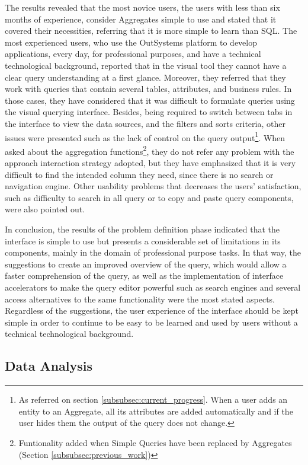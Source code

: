 The results revealed that the most novice users, the users with less than six months of experience, consider Aggregates simple to use and stated that it covered their necessities, referring that it is more simple to learn than \gls{SQL}. The most experienced users, who use the OutSystems platform to develop applications, every day, for professional purposes, and have a technical technological background, reported that in the visual tool they cannot have a clear query understanding at a first glance. Moreover, they referred that they work with queries that contain several tables, attributes, and business rules. In those cases, they have considered that it was difficult to formulate queries using the visual querying interface. Besides, being required to switch between tabs in the interface to view the data sources, and the filters and sorts criteria, other issues were presented such as the lack of control on the query output\footnote{As referred on section \ref{subsubsec:current_progress}. When a user adds an entity to an Aggregate, all its attributes are added automatically and if the user hides them the output of the query does not change.}. When asked about the aggregation functions\footnote{Funtionality added when Simple Queries have been replaced by Aggregates (Section \ref{subsubsec:previous_work})}, they do not refer any problem with the approach interaction strategy adopted, but they have emphasized that it is very difficult to find the intended column they need, since there is no search or navigation engine. Other usability problems that decreases the users’ satisfaction, such as difficulty to search in all query or to copy and paste query components, were also pointed out.

In conclusion, the results of the problem definition phase indicated that the interface is simple to use but presents a considerable set of limitations in its components, mainly in the domain of professional purpose tasks. In that way, the suggestions to create an improved overview of the query, which would allow a faster comprehension of the query, as well as the implementation of interface accelerators to make the query editor powerful such as search engines and several access alternatives to the same functionality were the most stated aspects. Regardless of the suggestions, the user experience of the interface should be kept simple in order to continue to be easy to be learned and used by users without a technical technological background.

\subsection{Data Analysis}
\label{subsec:data_analysis}

